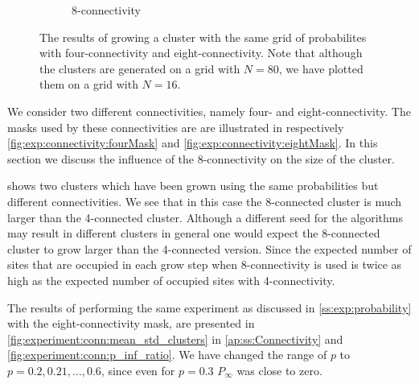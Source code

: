 \begin{figure}
\begin{subfigure}{0.45\columnwidth}
		\caption{8-connectivity}
		\label{fig:exp:connectivity:eightConnect}
	\end{subfigure}	
	\caption{The results of growing a cluster with the same grid of probabilites with  four-connectivity and  eight-connectivity. Note that although the clusters are generated on a grid with $N = 80$, we have plotted them on a grid with $N = 16$.}
	\label{fig:exp:connectivityResults}
\end{figure}

We consider two different connectivities, namely four- and eight-connectivity. The masks used by these connectivities are are illustrated in respectively \cref{fig:exp:connectivity:fourMask} and \ref{fig:exp:connectivity:eightMask}. In this section we discuss the influence of the 8-connectivity on the size of the cluster.

 shows two clusters which have been grown using the same probabilities but different connectivities. We see that in this case the 8-connected cluster is much larger than the 4-connected cluster. Although a different seed for the algorithms may result in different clusters in general one would expect the 8-connected cluster to grow larger than the 4-connected version. Since the expected number of sites that are occupied in each grow step when 8-connectivity is used is twice as high as the expected number of occupied sites with 4-connectivity. 

The results of performing the same experiment as discussed in \cref{ss:exp:probability} with the eight-connectivity mask, are presented in \cref{fig:experiment:conn:mean_std_clusters} in \cref{ap:ss:Connectivity} and \cref{fig:experiment:conn:p_inf_ratio}. We have changed the range of $p$ to $p = 0.2, 0.21, \dotsc, 0.6$, since even for $p = 0.3$ $P_\infty$ was close to zero. 

